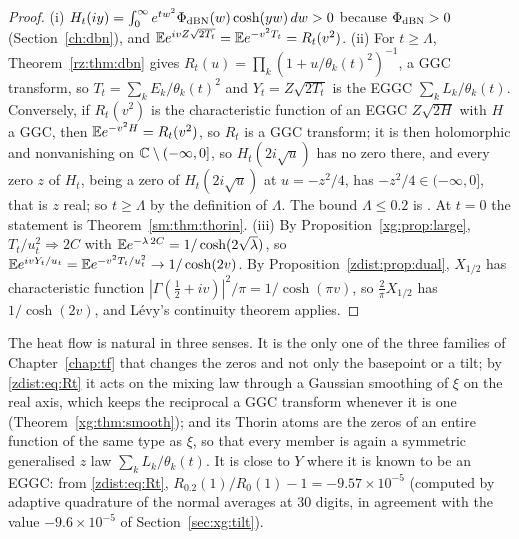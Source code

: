 \begin{proof}
(i) $H_t(iy)=\int_0^\infty e^{tw^2}\Phi_{\rm dBN}(w)\cosh(yw)\,dw>0$ because $\Phi_{\rm dBN}>0$ (Section~\ref{ch:dbn}), and $\mathbb{E} e^{ivZ\sqrt{2T_t}}=\mathbb{E} e^{-v^2T_t}=R_t(v^2)$. (ii) For $t\ge\Lambda$, Theorem~\ref{rz:thm:dbn} gives $R_t(u)=\prod_k(1+u/\theta_k(t)^2)^{-1}$, a GGC transform, so $T_t=\sum_kE_k/\theta_k(t)^2$ and $Y_t=Z\sqrt{2T_t}$ is the EGGC $\sum_kL_k/\theta_k(t)$. Conversely, if $R_t(v^2)$ is the characteristic function of an EGGC $Z\sqrt{2H}$ with $H$ a GGC, then $\mathbb{E} e^{-v^2H}=R_t(v^2)$, so $R_t$ is a GGC transform; it is then holomorphic and nonvanishing on $\mathbb{C}\setminus(-\infty,0]$, so $H_t(2i\sqrt u)$ has no zero there, and every zero $z$ of $H_t$, being a zero of $H_t(2i\sqrt u)$ at $u=-z^2/4$, has $-z^2/4\in(-\infty,0]$, that is $z$ real; so $t\ge\Lambda$ by the definition of $\Lambda$. The bound $\Lambda\le0.2$ is \cite{PT21}. At $t=0$ the statement is Theorem~\ref{sm:thm:thorin}. (iii) By Proposition~\ref{xg:prop:large}, $T_t/u_t^2\Rightarrow2C$ with $\mathbb{E} e^{-\lambda\,2C}=1/\cosh(2\sqrt\lambda)$, so $\mathbb{E} e^{ivY_t/u_t}=\mathbb{E} e^{-v^2T_t/u_t^2}\to1/\cosh(2v)$. By Proposition~\ref{zdist:prop:dual}, $X_{1/2}$ has characteristic function $|\Gamma(\frac12+iv)|^2/\pi=1/\cosh(\pi v)$, so $\frac2\pi X_{1/2}$ has $1/\cosh(2v)$, and L\'evy's continuity theorem applies.
\end{proof}

The heat flow is natural in three senses. It is the only one of the three families of Chapter~\ref{chap:tf} that changes the zeros and not only the basepoint or a tilt; by \eqref{zdist:eq:Rt} it acts on the mixing law through a Gaussian smoothing of $\xi$ on the real axis, which keeps the reciprocal a GGC transform whenever it is one (Theorem~\ref{xg:thm:smooth}); and its Thorin atoms are the zeros of an entire function of the same type as $\xi$, so that every member is again a symmetric generalised $z$ law $\sum_kL_k/\theta_k(t)$. It is close to $Y$ where it is known to be an EGGC: from \eqref{zdist:eq:Rt}, $R_{0.2}(1)/R_0(1)-1=-9.57\times10^{-5}$ (computed by adaptive quadrature of the normal averages at 30 digits, in agreement with the value $-9.6\times10^{-5}$ of Section~\ref{sec:xg:tilt}).

